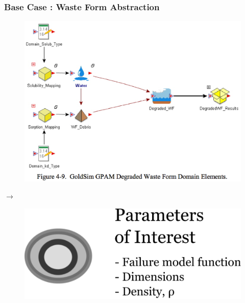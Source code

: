 \begin{frame}[ctb!]
  \frametitle{Base Case : Waste Form Abstraction}
  \begin{minipage}{0.45\textwidth}
    \begin{figure}[h!]
      \begin{center}
        \includegraphics[width=\textwidth]{wf.eps}
      \end{center}
    \end{figure}
  \end{minipage}
  \hspace{0.01cm}\large{$\rightarrow$}\hspace{0.01cm}
  \begin{minipage}{0.45\textwidth}
    \begin{figure}[h!]
      \begin{center}
        \includegraphics[width=\textwidth]{abstractionWF.eps}
      \end{center}
    \end{figure}
  \end{minipage}
\end{frame}

